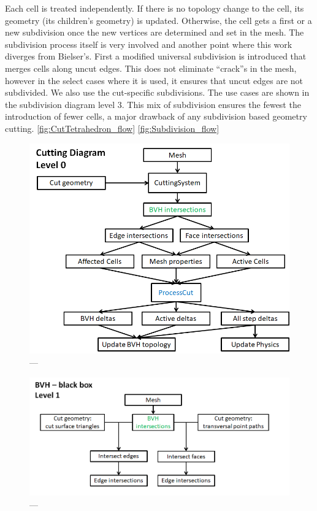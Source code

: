Each cell is treated independently. If there is no topology change to the cell, its geometry (its children’s geometry) is updated. Otherwise, the cell gets a first or a new subdivision once the new vertices are determined and set in the mesh. The subdivision process itself is very involved and another point where this work diverges from Bielser’s. First a modified universal subdivision is introduced that merges cells along uncut edges. This does not eliminate “crack”s in the mesh, however in the select cases where it is used, it ensures that uncut edges are not subdivided. We also use the cut-specific subdivisions. The use cases are shown in the subdivision diagram level 3. This mix of subdivision ensures the fewest the introduction of fewer cells, a major drawback of any subdivision based geometry cutting. \ref{fig:CutTetrahedron_flow} \ref{fig:Subdivision_flow}


\begin{figure}
  \centering%
  \includegraphics[width=0.85\linewidth]{figures/cutting/Process_cut.png}
  \caption{---}\label{fig:Cutting_process_flow}
\end{figure}



\begin{figure}
  \centering%
  \includegraphics[width=0.85\linewidth]{figures/cutting/BVH.png}
  \caption{---}\label{fig:BVH_flow}
\end{figure}



